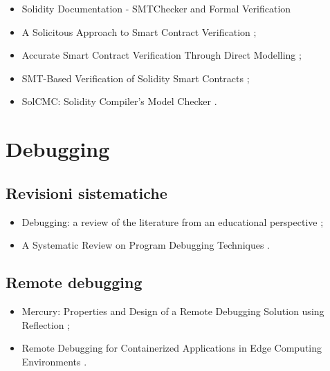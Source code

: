 \begin{itemize}

\item Solidity Documentation - SMTChecker and Formal Verification \cite{solidity0.8.18smtchecker}

\item A Solicitous Approach to Smart Contract Verification \cite{otoni2023smtchecker};

\item Accurate Smart Contract Verification Through Direct Modelling \cite{marescotti2020smtchecker};

\item SMT-Based Verification of Solidity Smart Contracts \cite{alt2018smtchecker};

\item SolCMC: Solidity Compiler's Model Checker \cite{alt2022smtchecker}.

\end{itemize}

\section*{Debugging}

\subsection*{Revisioni sistematiche}
\begin{itemize}

\item Debugging: a review of the literature from an educational perspective \cite{mccauley2008debugreview};

\item A Systematic Review on Program Debugging Techniques \cite{ghosh2019debugreview}.

\end{itemize}

\subsection*{Remote debugging}
\begin{itemize}

\item Mercury: Properties and Design of a Remote Debugging Solution using Reflection \cite{papoulias2015remotedebug};

\item Remote Debugging for Containerized Applications in Edge Computing Environments \cite{ozcan2019remotedebug}.

\end{itemize}

